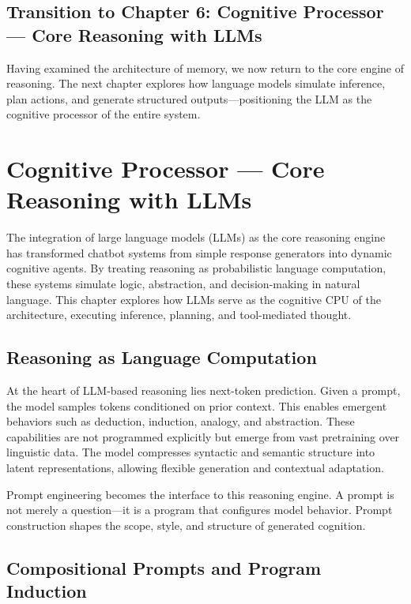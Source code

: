 \documentclass{book}
\begin{document}
\section*{Transition to Chapter 6: Cognitive Processor — Core Reasoning with LLMs}

Having examined the architecture of memory, we now return to the core engine of reasoning. The next chapter explores how language models simulate inference, plan actions, and generate structured outputs—positioning the LLM as the cognitive processor of the entire system.

\chapter{Cognitive Processor — Core Reasoning with LLMs}

The integration of large language models (LLMs) as the core reasoning engine has transformed chatbot systems from simple response generators into dynamic cognitive agents. By treating reasoning as probabilistic language computation, these systems simulate logic, abstraction, and decision-making in natural language. This chapter explores how LLMs serve as the cognitive CPU of the architecture, executing inference, planning, and tool-mediated thought.

\section{Reasoning as Language Computation}

At the heart of LLM-based reasoning lies next-token prediction. Given a prompt, the model samples tokens conditioned on prior context. This enables emergent behaviors such as deduction, induction, analogy, and abstraction. These capabilities are not programmed explicitly but emerge from vast pretraining over linguistic data. The model compresses syntactic and semantic structure into latent representations, allowing flexible generation and contextual adaptation.

Prompt engineering becomes the interface to this reasoning engine. A prompt is not merely a question—it is a program that configures model behavior. Prompt construction shapes the scope, style, and structure of generated cognition.

\section{Compositional Prompts and Program Induction}
\end{document}
